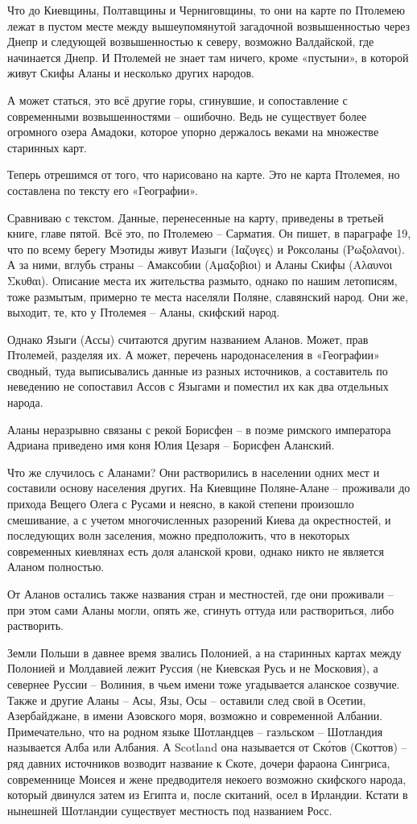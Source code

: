 Что до Киевщины, Полтавщины и Черниговщины, то они на карте по Птолемею лежат в пустом месте между вышеупомянутой загадочной возвышенностью через Днепр и следующей возвышенностью к северу, возможно Валдайской, где начинается Днепр. И Птолемей не знает там ничего, кроме «пустыни», в которой живут Скифы Аланы и несколько других народов.

А может статься, это всё другие горы, сгинувшие, и сопоставление с современными возвышенностями – ошибочно. Ведь не существует более огромного озера Амадоки, которое упорно держалось веками на множестве старинных карт.

Теперь отрешимся от того, что нарисовано на карте. Это не карта Птолемея, но составлена по тексту его «Географии». 

Сравниваю с текстом. Данные, перенесенные на карту, приведены в третьей книге, главе пятой. Всё это, по Птолемею – Сарматия. Он пишет, в параграфе 19, что по всему берегу Мэотиды живут Иазыги (Ιαζυγες) и Роксоланы (Ρωξολανοι). А за ними, вглубь страны – Амаксобии (Αμαξοβιοι) и Аланы Скифы (Αλαυνοι Σκυθαι). Описание места их жительства размыто, однако по нашим летописям, тоже размытым, примерно те места населяли Поляне, славянский народ. Они же, выходит, те, кто у Птолемея – Аланы, скифский народ. 

Однако Языги (Ассы) считаются другим названием Аланов. Может, прав Птолемей, разделяя их. А может, перечень народонаселения в «Географии» сводный, туда выписывались данные из разных источников, а составитель по неведению не сопоставил Ассов с Языгами и поместил их как два отдельных народа.

Аланы неразрывно связаны с рекой Борисфен – в поэме римского императора Адриана приведено имя коня Юлия Цезаря – Борисфен Аланский.

Что же случилось с Аланами? Они растворились в населении одних мест и составили основу населения других. На Киевщине Поляне-Алане – проживали до прихода Вещего Олега с Русами и неясно, в какой степени произошло смешивание, а с учетом многочисленных разорений Киева да окрестностей, и последующих волн заселения, можно предположить, что в некоторых современных киевлянах есть доля аланской крови, однако никто не является Аланом полностью. 

От Аланов остались также названия стран и местностей, где они проживали – при этом сами Аланы могли, опять же, сгинуть оттуда или раствориться, либо растворить. 

Земли Польши в давнее время звались Полонией, а на старинных картах между Полонией и Молдавией лежит Руссия (не Киевская Русь и не Московия), а севернее Руссии – Волиния, в чьем имени тоже угадывается аланское созвучие. Также и другие Аланы – Асы, Язы, Осы – оставили след свой в Осетии, Азербайджане, в имени Азовского моря, возможно и современной Албании. Примечательно, что на родном языке Шотландцев – гаэльском – Шотландия называется Алба или Албания. А Scotland она называется от Ск\'отов (Скоттов) – ряд давних источников возводит название к Скоте, дочери фараона Сингриса, современнице Моисея и жене предводителя некоего возможно скифского народа, который двинулся затем из Египта и, после скитаний, осел в Ирландии. Кстати в нынешней Шотландии существует местность под названием Росс.

